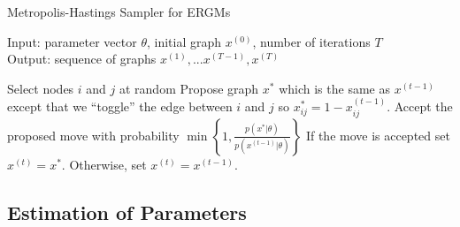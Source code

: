 \begin{algorithm}
	\caption{Metropolis-Hastings Sampler for ERGMs}
	Input: parameter vector $\theta$, initial graph $x^{(0)}$, number of iterations $T$ \\
	Output: sequence of graphs $x^{(1)},...x^{(T-1)},x^{(T)}$
	
	\begin{algorithmic}[1]
		\State Select nodes $i$ and $j$ at random
		\State Propose graph $x^*$ which is the same as $x^{(t-1)}$ except that we ``toggle'' the edge between $i$ and $j$ so $x^*_{ij} = 1 - x^{(t-1)}_{ij}$.
		\State Accept the proposed move with probability $\min\left\{1, \frac{p(x^* | \theta)}{p(x^{(t-1)} | \theta)} \right\}$
		\State If the move is accepted set $x^{(t)} = x^*$. Otherwise, set $x^{(t)} = x^{(t-1)}$.
		\EndFor
	\end{algorithmic}
\end{algorithm}

\subsection{Estimation of Parameters}



